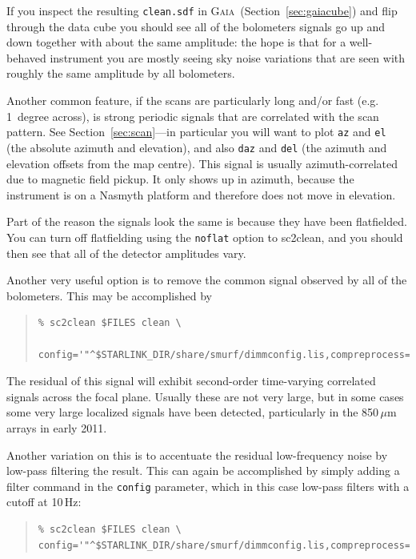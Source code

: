 \documentclass[twoside,11pt]{article}
\newcommand{\htmlref}[2]{#1}
\newcommand{\latexhtml}[2]{#1}
\newcommand{\xref}[3]{#1}
\renewcommand{\_}{\texttt{\symbol{95}}}
\newenvironment{myquote}{\begin{quote}\begin{small}}{\end{small}\end{quote}}
\newcommand{\gaia}{\xref{\textsc{Gaia}}{sun214}{}}
\newcommand{\task}[1]{\textsf{#1}}
\newcommand{\cref}[3]{\latexhtml{#1~\ref{#2}}{\htmlref{#3}{#2}}}
\begin{document}
If you inspect the resulting \texttt{clean.sdf} in \gaia\
(\cref{Section}{sec:gaiacube}{Displaying time-series data}) and flip
through the data cube you should
see all of the bolometers signals go up and down together with about
the same amplitude: the hope is that for a well-behaved instrument you
are mostly seeing sky noise variations that are seen with roughly the
same amplitude by all bolometers.

Another common feature, if the scans are particularly long and/or fast
(e.g. 1~degree across), is strong periodic signals that are correlated
with the scan pattern. See \cref{Section}{sec:scan}{Displaying scan
patterns}---in particular
you will want to plot \texttt{az} and \texttt{el} (the absolute
azimuth and elevation), and also \texttt{daz} and \texttt{del} (the
azimuth and elevation offsets from the map centre). This signal is
usually azimuth-correlated due to magnetic field pickup. It only shows
up in azimuth, because the instrument is on a Nasmyth platform and
therefore does not move in elevation.

Part of the reason the signals look the same is because they have been
flatfielded. You can turn off flatfielding using the \texttt{noflat}
option to \task{sc2clean}, and you should then see that all of the detector
amplitudes vary.

Another very useful option is to remove the common signal observed by
all of the bolometers. This may be accomplished by

\begin{myquote}
\begin{verbatim}
% sc2clean $FILES clean \
   config='"^$STARLINK_DIR/share/smurf/dimmconfig.lis,compreprocess=1"'
\end{verbatim}
\end{myquote}

The residual of this signal will exhibit second-order time-varying
correlated signals across the focal plane. Usually these are not very
large, but in some cases some very large localized signals have been
detected, particularly in the 850\,$\mu$m arrays in early 2011.

Another variation on this is to accentuate the residual low-frequency
noise by low-pass filtering the result. This can again be accomplished
by simply adding a filter command in the \texttt{config} parameter,
which in this case low-pass filters with a cutoff at 10\,Hz:

\begin{myquote}
\begin{verbatim}
% sc2clean $FILES clean \
config='"^$STARLINK_DIR/share/smurf/dimmconfig.lis,compreprocess=1,filt_edgelow=10"'
\end{verbatim}
\end{myquote}
\end{document}
